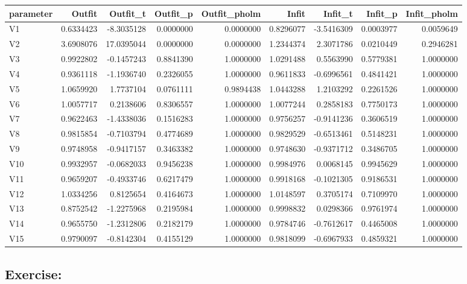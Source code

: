 \documentclass[
]{book}
\begin{document}
\begin{tabular}{l|r|r|r|r|r|r|r|r}
\hline
parameter & Outfit & Outfit\_t & Outfit\_p & Outfit\_pholm & Infit & Infit\_t & Infit\_p & Infit\_pholm\\
\hline
V1 & 0.6334423 & -8.3035128 & 0.0000000 & 0.0000000 & 0.8296077 & -3.5416309 & 0.0003977 & 0.0059649\\
\hline
V2 & 3.6908076 & 17.0395044 & 0.0000000 & 0.0000000 & 1.2344374 & 2.3071786 & 0.0210449 & 0.2946281\\
\hline
V3 & 0.9922802 & -0.1457243 & 0.8841390 & 1.0000000 & 1.0291488 & 0.5563990 & 0.5779381 & 1.0000000\\
\hline
V4 & 0.9361118 & -1.1936740 & 0.2326055 & 1.0000000 & 0.9611833 & -0.6996561 & 0.4841421 & 1.0000000\\
\hline
V5 & 1.0659920 & 1.7737104 & 0.0761111 & 0.9894438 & 1.0443288 & 1.2103292 & 0.2261526 & 1.0000000\\
\hline
V6 & 1.0057717 & 0.2138606 & 0.8306557 & 1.0000000 & 1.0077244 & 0.2858183 & 0.7750173 & 1.0000000\\
\hline
V7 & 0.9622463 & -1.4338036 & 0.1516283 & 1.0000000 & 0.9756257 & -0.9141236 & 0.3606519 & 1.0000000\\
\hline
V8 & 0.9815854 & -0.7103794 & 0.4774689 & 1.0000000 & 0.9829529 & -0.6513461 & 0.5148231 & 1.0000000\\
\hline
V9 & 0.9748958 & -0.9417157 & 0.3463382 & 1.0000000 & 0.9748630 & -0.9371712 & 0.3486705 & 1.0000000\\
\hline
V10 & 0.9932957 & -0.0682033 & 0.9456238 & 1.0000000 & 0.9984976 & 0.0068145 & 0.9945629 & 1.0000000\\
\hline
V11 & 0.9659207 & -0.4933746 & 0.6217479 & 1.0000000 & 0.9918168 & -0.1021305 & 0.9186531 & 1.0000000\\
\hline
V12 & 1.0334256 & 0.8125654 & 0.4164673 & 1.0000000 & 1.0148597 & 0.3705174 & 0.7109970 & 1.0000000\\
\hline
V13 & 0.8752542 & -1.2275968 & 0.2195984 & 1.0000000 & 0.9998832 & 0.0298366 & 0.9761974 & 1.0000000\\
\hline
V14 & 0.9655750 & -1.2312806 & 0.2182179 & 1.0000000 & 0.9784746 & -0.7612617 & 0.4465008 & 1.0000000\\
\hline
V15 & 0.9790097 & -0.8142304 & 0.4155129 & 1.0000000 & 0.9818099 & -0.6967933 & 0.4859321 & 1.0000000\\
\hline
\end{tabular}

\hypertarget{exercise-1}{%
\subsection{Exercise:}\label{exercise-1}}
\end{document}
